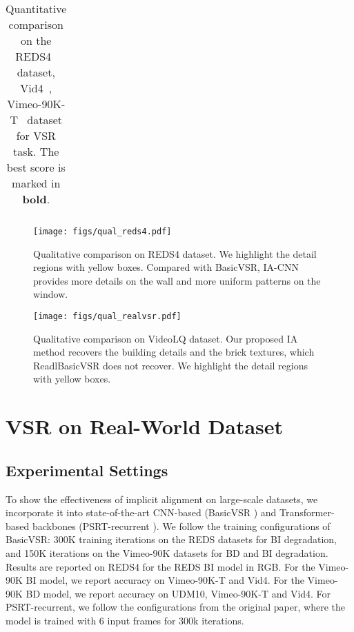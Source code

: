 \documentclass[10pt,twocolumn,letterpaper]{article}
\begin{document}
\begin{table*}[t]
{\begin{tabular}{l|c|c|cc|cc|cc}
    
  \end{tabular}}
    \vspace{-0.5em}
    \caption{Quantitative comparison on the REDS4~\cite{nah2019ntire} dataset, Vid4~\cite{liu2013bayesian}, Vimeo-90K-T~\cite{xue2019video_tof} dataset for  VSR task. The best score is marked in \textbf{bold}.}\label{tab:comparision_sota}
    \vspace{-0.5em}
\end{table*}

\begin{figure*}[h!]
\centering

\texttt{[image: figs/qual\_reds4.pdf]}\label{fig:qual_reds4}

\vspace{-.3cm}
\caption{Qualitative comparison on REDS4 dataset. We highlight the detail regions with yellow boxes. Compared with BasicVSR, IA-CNN provides more details on the wall and more uniform patterns on the window.}
\vspace{-.5cm}
\end{figure*}


\begin{figure*}[t!]
\centering

\texttt{[image: figs/qual\_realvsr.pdf]}
\caption{Qualitative comparison on VideoLQ dataset. Our proposed IA method recovers the building details and the brick textures, which ReadlBasicVSR does not recover. We highlight the detail regions with yellow boxes.}\label{fig:qual_realvsr}
\end{figure*}

\section{VSR on Real-World Dataset}
\vspace{-0.2em}
\subsection{Experimental Settings}
\vspace{-0.2em}
To show the effectiveness of implicit alignment on large-scale datasets, we incorporate it into state-of-the-art CNN-based (BasicVSR \cite{chan2021basicvsr}) and Transformer-based backbones (PSRT-recurrent \cite{shi2022rethinking}).
We follow the training configurations of BasicVSR: 300K training iterations on the REDS datasets for BI degradation, and 150K iterations on the Vimeo-90K datasets for BD and BI degradation. Results are reported on REDS4 for the REDS BI model in RGB. For the Vimeo-90K BI model, we report accuracy on Vimeo-90K-T and Vid4. For the Vimeo-90K BD model, we report accuracy on UDM10, Vimeo-90K-T and Vid4. For PSRT-recurrent, we follow the configurations from the original paper, where the model is trained with 6 input frames for 300k iterations.
\vspace{-0.2em}
\end{document}
